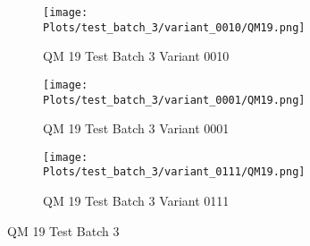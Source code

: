 \documentclass{DissertateFigs}
\begin{document}
\begin{figure}[t!]
\medskip

    \begin{subfigure}{0.47\textwidth}
    \texttt{[image: Plots/test\_batch\_3/variant\_0010/QM19.png]}
    \caption{QM 19 Test Batch 3 Variant 0010}
    \end{subfigure}
    \begin{subfigure}{0.47\textwidth}
    \texttt{[image: Plots/test\_batch\_3/variant\_0001/QM19.png]}
    \caption{QM 19 Test Batch 3 Variant 0001}
    \end{subfigure}

\medskip

    \begin{subfigure}{0.47\textwidth}
    \texttt{[image: Plots/test\_batch\_3/variant\_0111/QM19.png]}
    \caption{QM 19 Test Batch 3 Variant 0111}
    \end{subfigure}
\caption{QM 19 Test Batch 3}
    \end{figure}
\clearpage
\end{document}
